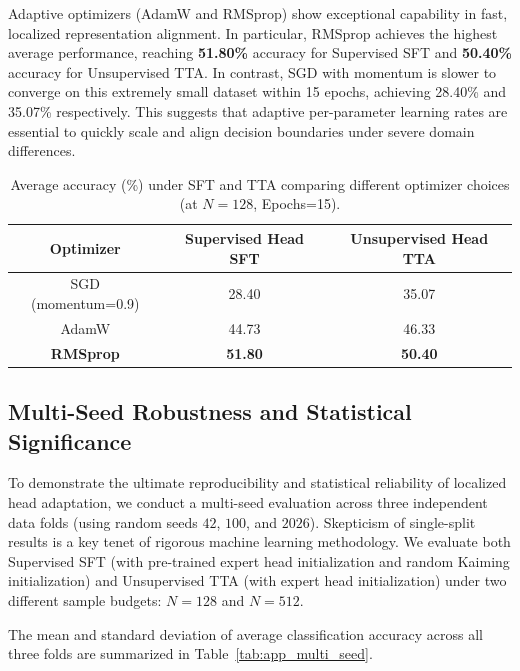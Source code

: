 \documentclass{article}
\theoremstyle{plain}
\theoremstyle{definition}
\theoremstyle{remark}
\begin{document}
Adaptive optimizers (AdamW and RMSprop) show exceptional capability in fast, localized representation alignment. In particular, RMSprop achieves the highest average performance, reaching \textbf{51.80\%} accuracy for Supervised SFT and \textbf{50.40\%} accuracy for Unsupervised TTA. In contrast, SGD with momentum is slower to converge on this extremely small dataset within 15 epochs, achieving 28.40\% and 35.07\% respectively. This suggests that adaptive per-parameter learning rates are essential to quickly scale and align decision boundaries under severe domain differences.

\begin{table}[h]
\caption{Average accuracy (\%) under SFT and TTA comparing different optimizer choices (at $N=128$, Epochs=15).}
\label{tab:app_optimizers}
\begin{center}
\begin{tabular}{ccc}
\toprule
\textbf{Optimizer} & \textbf{Supervised Head SFT} & \textbf{Unsupervised Head TTA} \\
\midrule
SGD (momentum=0.9) & 28.40 & 35.07 \\
AdamW & 44.73 & 46.33 \\
\textbf{RMSprop} & \textbf{51.80} & \textbf{50.40} \\
\bottomrule
\end{tabular}
\end{center}
\end{table}

\subsection{Multi-Seed Robustness and Statistical Significance}
\label{appendix:multi_seed}

To demonstrate the ultimate reproducibility and statistical reliability of localized head adaptation, we conduct a multi-seed evaluation across three independent data folds (using random seeds $42$, $100$, and $2026$). Skepticism of single-split results is a key tenet of rigorous machine learning methodology. We evaluate both Supervised SFT (with pre-trained expert head initialization and random Kaiming initialization) and Unsupervised TTA (with expert head initialization) under two different sample budgets: $N=128$ and $N=512$.

The mean and standard deviation of average classification accuracy across all three folds are summarized in Table~\ref{tab:app_multi_seed}.
\end{document}
